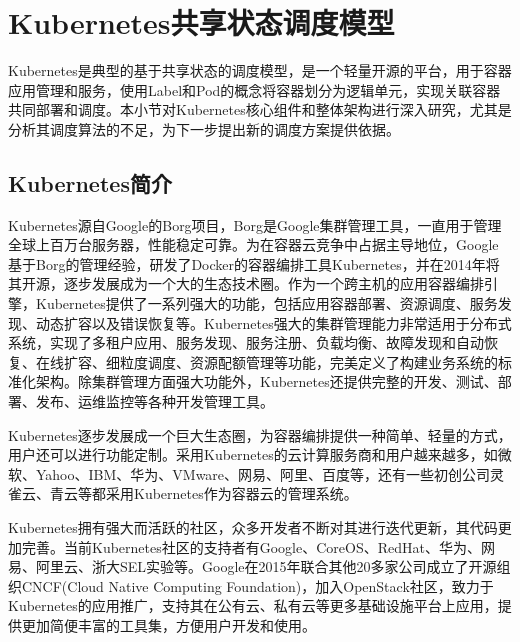 \section{Kubernetes共享状态调度模型}
Kubernetes是典型的基于共享状态的调度模型，是一个轻量开源的平台，用于容器应用管理和服务，使用Label和Pod的概念将容器划分为逻辑单元，实现关联容器共同部署和调度。本小节对Kubernetes核心组件和整体架构进行深入研究，尤其是分析其调度算法的不足，为下一步提出新的调度方案提供依据。
\subsection{Kubernetes简介}
Kubernetes源自Google的Borg项目，Borg是Google集群管理工具，一直用于管理全球上百万台服务器，性能稳定可靠。为在容器云竞争中占据主导地位，Google基于Borg的管理经验，研发了Docker的容器编排工具Kubernetes，并在2014年将其开源，逐步发展成为一个大的生态技术圈。作为一个跨主机的应用容器编排引擎，Kubernetes提供了一系列强大的功能，包括应用容器部署、资源调度、服务发现、动态扩容以及错误恢复等。Kubernetes强大的集群管理能力非常适用于分布式系统，实现了多租户应用、服务发现、服务注册、负载均衡、故障发现和自动恢复、在线扩容、细粒度调度、资源配额管理等功能，完美定义了构建业务系统的标准化架构。除集群管理方面强大功能外，Kubernetes还提供完整的开发、测试、部署、发布、运维监控等各种开发管理工具。

Kubernetes逐步发展成一个巨大生态圈，为容器编排提供一种简单、轻量的方式，用户还可以进行功能定制。采用Kubernetes的云计算服务商和用户越来越多，如微软、Yahoo、IBM、华为、VMware、网易、阿里、百度等，还有一些初创公司灵雀云、青云等都采用Kubernetes作为容器云的管理系统。

Kubernetes拥有强大而活跃的社区，众多开发者不断对其进行迭代更新，其代码更加完善。当前Kubernetes社区的支持者有Google、CoreOS、RedHat、华为、网易、阿里云、浙大SEL实验等。Google在2015年联合其他20多家公司成立了开源组织CNCF(Cloud Native Computing Foundation)，加入OpenStack社区，致力于Kubernetes的应用推广，支持其在公有云、私有云等更多基础设施平台上应用，提供更加简便丰富的工具集，方便用户开发和使用。

